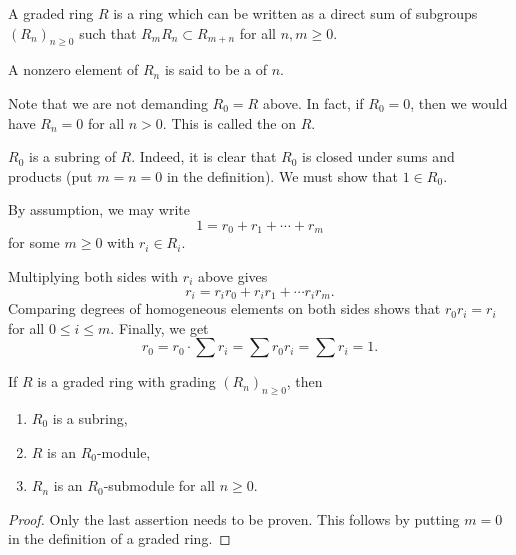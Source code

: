 \begin{defn}
	A graded ring $R$ is a ring which can be written as a direct sum of subgroups $(R_{n})_{n \ge 0}$ such that $R_{m} R_{n} \subset R_{m + n}$ for all $n, m \ge 0$.

	A nonzero element of $R_{n}$ is said to be a  of  $n$.
\end{defn}

\begin{rem}
	Note that we are not demanding $R_{0} = R$ above. In fact, if $R_{0} = 0$, then we would have $R_{n} = 0$ for all $n > 0$. This is called the  on $R$.
\end{rem}

\begin{obs}
	$R_{0}$ is a subring of $R$. Indeed, it is clear that $R_{0}$ is closed under sums and products (put $m = n = 0$ in the definition). \newline
	We must show that $1 \in R_{0}$.

	By assumption, we may write
	\begin{equation*} 
		1 = r_{0} + r_{1} + \cdots + r_{m}
	\end{equation*}
	for some $m \ge 0$ with $r_{i} \in R_{i}$.

	Multiplying both sides with $r_{i}$ above gives
	\begin{equation*} 
		r_{i} = r_{i} r_{0} + r_{i} r_{1} + \cdots r_{i} r_{m}.
	\end{equation*}
	Comparing degrees of homogeneous elements on both sides shows that $r_{0} r_{i} = r_{i}$ for all $0 \le i \le m$. Finally, we get
	\begin{equation*} 
		r_{0} = r_{0} \cdot \sum r_{i} = \sum r_{0} r_{i} = \sum r_{i} = 1.
	\end{equation*}
\end{obs}

\begin{cor}
	If $R$ is a graded ring with grading $(R_{n})_{n \ge 0}$, then
	\begin{enumerate}
		\item $R_{0}$ is a subring,
		\item $R$ is an $R_{0}$-module,
		\item $R_{n}$ is an $R_{0}$-submodule for all $n \ge 0$.
	\end{enumerate}
\end{cor}
\begin{proof} 
	Only the last assertion needs to be proven. This follows by putting $m = 0$ in the definition of a graded ring.
\end{proof}


